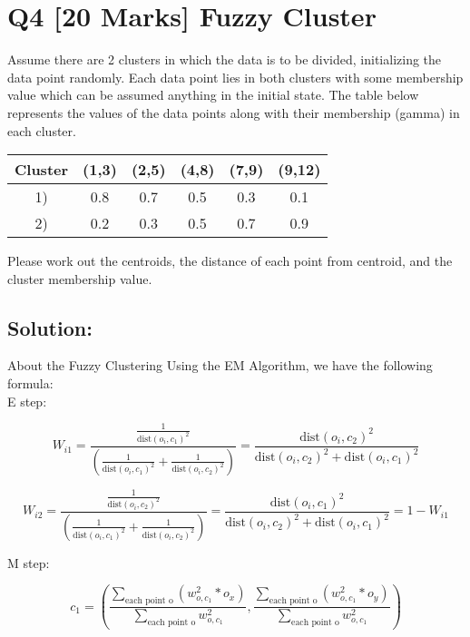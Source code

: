\section*{Q4 [20 Marks] Fuzzy Cluster} 

Assume there are 2 clusters in which the data is to be divided, initializing the data point randomly. 
Each data point lies in both clusters with some membership value which can be assumed anything in the initial state.
The table below represents the values of the data points along with their membership (gamma) in each cluster.

\begin{table}[h]
    \centering
    \begin{tabular}{|c|c|c|c|c|c|}
    \hline
    Cluster & (1,3) & (2,5) & (4,8) & (7,9) & (9,12) \\
    \hline
    1)      & 0.8   & 0.7   & 0.5   & 0.3   & 0.1    \\
    \hline
    2)      & 0.2   & 0.3   & 0.5   & 0.7   & 0.9    \\
    \hline
    \end{tabular}
\end{table}

Please work out the centroids, the distance of each point from centroid, and the cluster membership value.

\subsection*{Solution:}

About the Fuzzy Clustering Using the EM Algorithm, we have the following formula:\\
E step:

\[
    W_{i1} = \frac{\frac{1}{\text{dist}(o_i, c_1)^2}}{\left( \frac{1}{\text{dist}(o_i, c_1)^2} + \frac{1}{\text{dist}(o_i, c_2)^2} \right)}
    = \frac{\text{dist}(o_i, c_2)^2}{\text{dist}(o_i, c_2)^2 + \text{dist}(o_i, c_1)^2}
\]

\[
    W_{i2} = \frac{\frac{1}{\text{dist}(o_i, c_2)^2}}{\left( \frac{1}{\text{dist}(o_i, c_1)^2} + \frac{1}{\text{dist}(o_i, c_2)^2} \right)}
    = \frac{\text{dist}(o_i, c_1)^2}{\text{dist}(o_i, c_2)^2 + \text{dist}(o_i, c_1)^2}
    = 1-W_{i1}
\]

M step:

\[
    c_1 = \left( 
    \frac{\sum_\text{each point o} (w_{o,c_1}^2 * o_x)}{\sum_\text{each point o} w_{o,c_1}^2}, 
    \frac{\sum_\text{each point o} (w_{o,c_1}^2 * o_y)}{\sum_\text{each point o} w_{o,c_1}^2} 
    \right)
\]

